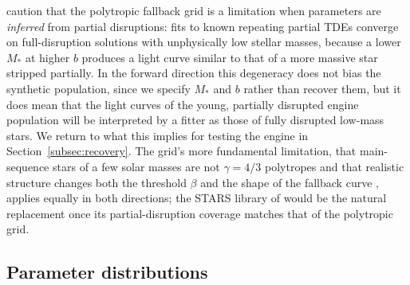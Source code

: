 \documentclass[twocolumn,pdftex]{aastex701}
\begin{document}
\citet{Angus:2026a} caution that the polytropic fallback grid is a limitation when parameters are {\it inferred} from partial disruptions: fits to known repeating partial TDEs converge on full-disruption solutions with unphysically low stellar masses, because a lower $M_{\ast}$ at higher $b$ produces a light curve similar to that of a more massive star stripped partially. In the forward direction this degeneracy does not bias the synthetic population, since we specify $M_{\ast}$ and $b$ rather than recover them, but it does mean that the light curves of the young, partially disrupted engine population will be interpreted by a fitter as those of fully disrupted low-mass stars. We return to what this implies for testing the engine in Section~\ref{subsec:recovery}. The grid's more fundamental limitation, that main-sequence stars of a few solar masses are not $\gamma = 4/3$ polytropes and that realistic structure changes both the threshold $\beta$ and the shape of the fallback curve \citep{Golightly:2019a,Law-Smith:2020a,Ryu:2020c}, applies equally in both directions; the STARS library of \citet{Law-Smith:2020a} would be the natural replacement once its partial-disruption coverage matches that of the polytropic grid.

\subsection{Parameter distributions}\label{subsec:params}
\end{document}
